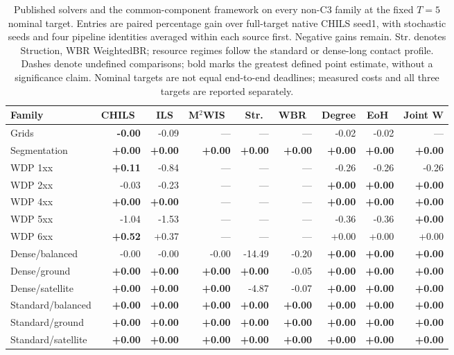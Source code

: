 \begin{table}[t]
\centering
\small
\setlength{\tabcolsep}{3pt}
\caption{Published solvers and the common-component framework on every non-C3 family at the fixed $T=5$ nominal target. Entries are paired percentage gain over full-target native CHILS seed1, with stochastic seeds and four pipeline identities averaged within each source first. Negative gains remain. Str. denotes Struction, WBR WeightedBR; resource regimes follow the standard or dense-long contact profile. Dashes denote undefined comparisons; bold marks the greatest defined point estimate, without a significance claim. Nominal targets are not equal end-to-end deadlines; measured costs and all three targets are reported separately.}
\label{tab:v06-published}
\begin{tabular}{lrrrrrrrr}
\toprule
Family & CHILS~\cite{grossmann2025chils} & ILS~\cite{grossmann2025chils} & M$^2$WIS~\cite{grossmann2024mmwis} & Str.~\cite{gellner2021struction} & WBR~\cite{lamm2019weighted} & Degree & EoH~\cite{liu2024eoh} & Joint W\\
\midrule
Grids & \textbf{-0.00} & -0.09 & --- & --- & --- & -0.02 & -0.02 & ---\\
Segmentation & \textbf{+0.00} & \textbf{+0.00} & \textbf{+0.00} & \textbf{+0.00} & \textbf{+0.00} & \textbf{+0.00} & \textbf{+0.00} & \textbf{+0.00}\\
WDP 1xx & \textbf{+0.11} & -0.84 & --- & --- & --- & -0.26 & -0.26 & -0.26\\
WDP 2xx & -0.03 & -0.23 & --- & --- & --- & \textbf{+0.00} & \textbf{+0.00} & \textbf{+0.00}\\
WDP 4xx & \textbf{+0.00} & \textbf{+0.00} & --- & --- & --- & \textbf{+0.00} & \textbf{+0.00} & \textbf{+0.00}\\
WDP 5xx & -1.04 & -1.53 & --- & --- & --- & -0.36 & -0.36 & \textbf{+0.00}\\
WDP 6xx & \textbf{+0.52} & +0.37 & --- & --- & --- & +0.00 & +0.00 & +0.00\\
Dense/balanced & -0.00 & -0.00 & -0.00 & -14.49 & -0.20 & \textbf{+0.00} & \textbf{+0.00} & \textbf{+0.00}\\
Dense/ground & \textbf{+0.00} & \textbf{+0.00} & \textbf{+0.00} & \textbf{+0.00} & -0.05 & \textbf{+0.00} & \textbf{+0.00} & \textbf{+0.00}\\
Dense/satellite & \textbf{+0.00} & \textbf{+0.00} & \textbf{+0.00} & -4.87 & -0.07 & \textbf{+0.00} & \textbf{+0.00} & \textbf{+0.00}\\
Standard/balanced & \textbf{+0.00} & \textbf{+0.00} & \textbf{+0.00} & \textbf{+0.00} & \textbf{+0.00} & \textbf{+0.00} & \textbf{+0.00} & \textbf{+0.00}\\
Standard/ground & \textbf{+0.00} & \textbf{+0.00} & \textbf{+0.00} & \textbf{+0.00} & \textbf{+0.00} & \textbf{+0.00} & \textbf{+0.00} & \textbf{+0.00}\\
Standard/satellite & \textbf{+0.00} & \textbf{+0.00} & \textbf{+0.00} & \textbf{+0.00} & \textbf{+0.00} & \textbf{+0.00} & \textbf{+0.00} & \textbf{+0.00}\\
\bottomrule
\end{tabular}
\end{table}

